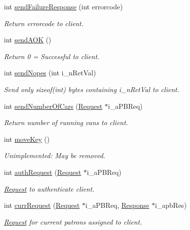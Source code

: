 \begin{DoxyCompactItemize}
int \hyperlink{classGTBCommunication_a48ac2db7bb407da8d59cfbf69110e598}{send\-Failure\-Response} (int errorcode)
\begin{DoxyCompactList}\small\item\em Return errorcode to client. \end{DoxyCompactList}\item 
int \hyperlink{classGTBCommunication_a53163e476fffb9c3b51b7297b5963e6b}{send\-A\-O\-K} ()
\begin{DoxyCompactList}\small\item\em Return 0 = Successful to client. \end{DoxyCompactList}\item 
int \hyperlink{classGTBCommunication_a83fbad40d9605078ff9a8ce29c57b383}{send\-Nopes} (int i\-\_\-n\-Ret\-Val)
\begin{DoxyCompactList}\small\item\em Send only sizeof(int) bytes containing i\-\_\-n\-Ret\-Val to client. \end{DoxyCompactList}\item 
int \hyperlink{classGTBCommunication_a8558ea1c9e19310b986d5ce84398ca20}{send\-Number\-Of\-Cars} (\hyperlink{classRequest}{Request} $\ast$i\-\_\-a\-P\-B\-Req)
\begin{DoxyCompactList}\small\item\em Return number of running vans to client. \end{DoxyCompactList}\item 
int \hyperlink{classGTBCommunication_a42a7648197f7ae8f3817aa8ff9ebca73}{move\-Key} ()
\begin{DoxyCompactList}\small\item\em Unimplemented\-: May be removed. \end{DoxyCompactList}\item 
int \hyperlink{classGTBCommunication_aed33aec9911e0d570d4653cabd776d6b}{auth\-Request} (\hyperlink{classRequest}{Request} $\ast$i\-\_\-a\-P\-B\-Req)
\begin{DoxyCompactList}\small\item\em \hyperlink{classRequest}{Request} to authenticate client. \end{DoxyCompactList}\item 
int \hyperlink{classGTBCommunication_ae20ca3b3751720d3ef10bbdfbd4cd25a}{curr\-Request} (\hyperlink{classRequest}{Request} $\ast$i\-\_\-a\-P\-B\-Req, \hyperlink{classResponse}{Response} $\ast$i\-\_\-apb\-Res)
\begin{DoxyCompactList}\small\item\em \hyperlink{classRequest}{Request} for current patrons assigned to client. \end{DoxyCompactList}\item 

\end{DoxyCompactItemize}
